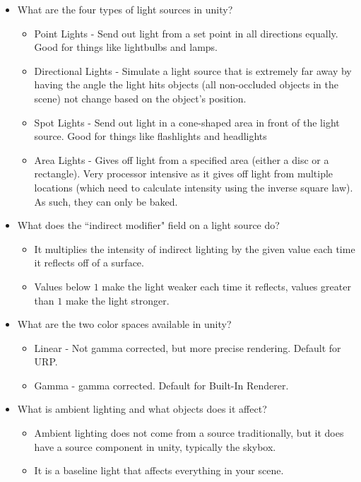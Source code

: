 \documentclass{article}
\begin{document}
\begin{itemize}
    \item What are the four types of light sources in unity?
    \begin{itemize}
        \item Point Lights - Send out light from a set point in all directions equally. Good for things like lightbulbs and lamps.
        \item Directional Lights - Simulate a light source that is extremely far away by having the angle the light hits objects (all non-occluded objects in the scene) not change based on the object's position.
        \item Spot Lights - Send out light in a cone-shaped area in front of the light source. Good for things like flashlights and headlights
        \item Area Lights - Gives off light from a specified area (either a disc or a rectangle). Very processor intensive as it gives off light from multiple locations (which need to calculate intensity using the inverse square law). As such, they can only be baked.
    \end{itemize}
    \item What does the ``indirect modifier" field on a light source do?
    \begin{itemize}
        \item It multiplies the intensity of indirect lighting by the given value each time it reflects off of a surface.
        \item Values below $1$ make the light weaker each time it reflects, values greater than $1$ make the light stronger.
    \end{itemize}
    \item What are the two color spaces available in unity?
    \begin{itemize}
        \item Linear - Not gamma corrected, but more precise rendering. Default for URP.
        \item Gamma - gamma corrected. Default for Built-In Renderer. 
    \end{itemize}
    \item What is ambient lighting and what objects does it affect?
    \begin{itemize}
        \item Ambient lighting does not come from a source traditionally, but it does have a source component in unity, typically the skybox.
        \item It is a baseline light that affects everything in your scene.

\end{itemize}
\end{itemize}
\end{document}
